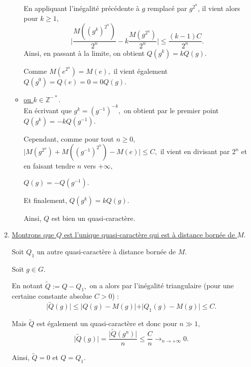 \begin{enumerate}
\begin{itemize}
En appliquant l'inégalité précédente à $g$ remplacé par $g^{2^{n}}$, il vient alors pour $k\geq 1,$ $$\vert \frac{M((g^{k})^{2^{n}})}{2^{n}}-k\frac{M(g^{2^{n}})}{2^{n}}\vert \leq \frac{(k-1)C}{2^{n}}.$$ 
Ainsi, en passant à la limite, on obtient $\displaystyle Q(g^{k})=kQ(g).$

Comme $\displaystyle M(e^{2^{n}})=M(e),$ il vient également $\displaystyle Q(g^{0})=Q(e)=0=0Q(g).$\\

\item \underline{ou $k\in \mathbb{Z}^{-*}.$}\\

En écrivant que $\displaystyle g^{k}=(g^{-1})^{-k},$ on obtient par le premier point $\displaystyle Q(g^{k})=-kQ(g^{-1}).$

Cependant, comme pour tout $n\geq 0,$ $\displaystyle \vert M(g^{2^{n}})+M((g^{-1})^{2^{n}})-M(e)\vert \leq C,$ il vient en divisant par $2^{n}$ et en faisant tendre $n$ vers $+\infty,$

$\displaystyle Q(g)=-Q(g^{-1}).$

Et finalement, $\displaystyle Q(g^{k})=kQ(g).$
 
Ainsi, $Q$ est bien un quasi-caractère.
\end{itemize}

\item \underline{Montrons que $Q$ est l'unique quasi-caractère qui est à distance bornée de $M.$}

Soit $Q_{1}$ un autre quasi-caractère à distance bornée de $M.$

Soit $g\in G.$

En notant $\tilde{Q}:=Q-Q_{1},$ on a alors par l'inégalité triangulaire (pour une certaine constante absolue $C>0$) : $$ \vert \tilde{Q}(g)\vert \leq \vert Q(g)-M(g)\vert + \vert Q_{1}(g)-M(g)\vert \leq C.$$ 

Mais $\tilde{Q}$ est également un quasi-caractère et donc pour $n\gg1,$ $$\vert \tilde{Q}(g) \vert = \frac{\vert \tilde{Q}(g^{n}) \vert }{n}\leq \frac{C}{n}\longrightarrow_{n\rightarrow +\infty} 0.$$

Ainsi, $\tilde{Q}=0$ et $Q=Q_{1}.$

\end{enumerate}







